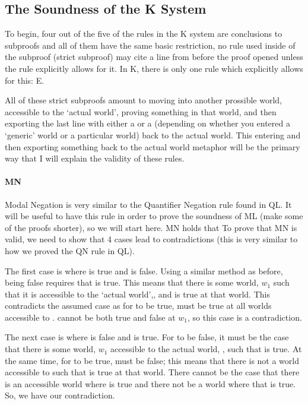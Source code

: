 \subsection{The Soundness of the K System}
To begin, four out of the five of the rules in the K system are conclusions to subproofs and all of them have the same basic restriction, no rule used inside of the subproof (strict subproof) may cite a line from before the proof opened unless the rule explicitly allows for it. In K, there is only one rule which explicitly allows for this: \ebox E.  

All of these strict subproofs amount to moving into another prossible world, accessible to the `actual world', proving something in that world, and then exporting the last line with either a \ediamond  or a \ebox  (depending on whether you entered a `generic' world or a particular world) back to the actual world. This entering and then exporting something back to the actual world metaphor will be the primary way that I will explain the validity of these rules. 

\paragraph{MN}
Modal Negation is very similar to the Quantifier Negation rule found in QL. It will be useful to have this rule in order to prove the soundness of ML (make some of the proofs shorter), so we will start here. MN holds that To prove that MN is valid, we need to show that 4 cases lead to contradictions (this is very similar to how we proved the QN rule in QL). 

The first case is where \ebox\enot{} is true and \enot\ediamond{} is false. Using a similar method as before, \enot\ediamond{} being false requires that \ediamond{} is true. This means that there is some world, $w_1$ such that it is accessible to the `actual world',, and  is true at that world. This contradicts the assumed case as for  \ebox\enot{} to be true, \enot{} must be true at all worlds accessible to .  cannot be both true and false at $w_1$, so this case is a contradiction.

The next case is where \ebox\enot{} is false and \enot\ediamond{} is true. For \ebox\enot{} to be false, it must be the case that there is some world, $w_1$ accessible to the actual world, , such that  is true. At the same time, for  \enot\ediamond{} to be true,  \ediamond{} must be false; this means that there is not a world accessible to  such that  is true at that world. There cannot be the case that there is an accessible world where  is true and there not be a world where that is true. So, we have our contradiction.

